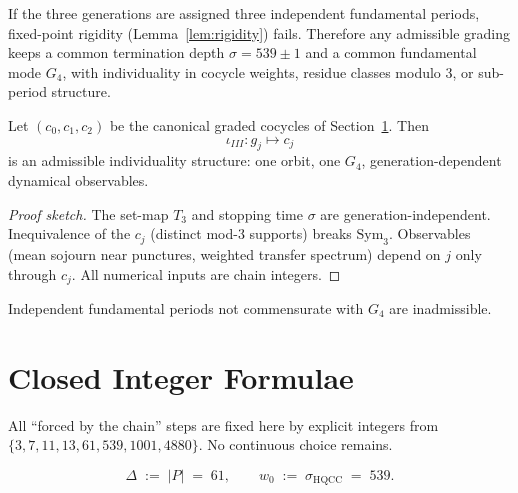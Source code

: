 \begin{lemma}
\label{lem:common-orbit}
If the three generations are assigned three independent fundamental periods,
fixed-point rigidity (Lemma~\ref{lem:rigidity}) fails. Therefore any admissible
grading keeps a common termination depth \(\sigma=539\pm 1\) and a common
fundamental mode \(G_4\), with individuality in cocycle weights, residue classes
modulo 3, or sub-period structure.
\end{lemma}

\begin{theorem}
\label{thm:route3}
Let \((c_0,c_1,c_2)\) be the canonical graded cocycles of
Section~\ref{sec:closed}. Then
\[
\iota_{III}\colon g_j\mapsto c_j
\]
is an admissible individuality structure: one orbit, one \(G_4\),
generation-dependent dynamical observables.
\end{theorem}

\begin{proof}[Proof sketch]
The set-map \(T_3\) and stopping time \(\sigma\) are generation-independent.
Inequivalence of the \(c_j\) (distinct mod-3 supports) breaks \(\mathrm{Sym}_3\).
Observables (mean sojourn near punctures, weighted transfer spectrum) depend on
\(j\) only through \(c_j\). All numerical inputs are chain integers.
\end{proof}

\begin{remark}
Independent fundamental periods not commensurate with \(G_4\) are inadmissible.
\end{remark}

\section{Closed Integer Formulae}
\label{sec:closed}

All ``forced by the chain'' steps are fixed here by explicit integers from
\(\{3,7,11,13,61,539,1001,4880\}\). No continuous choice remains.

\begin{definition}
\label{def:Delta}
\[
\Delta \;:=\; |P| \;=\; 61,
\qquad
w_0 \;:=\; \sigma_{\mathrm{HQCC}} \;=\; 539.
\]
\end{definition}


